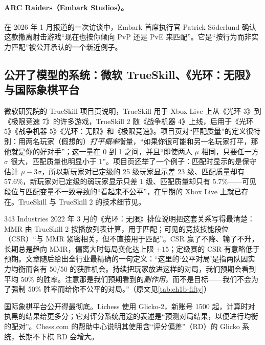 \paragraph{ARC Raiders（Embark Studios）。}
在 2026 年 1 月报道的一次访谈中，Embark 首席执行官 Patrick Söderlund 确认这款撤离射击游戏“现在也按你倾向 PvP 还是 PvE 来匹配”\cite{techradar2026arc}\tagOff{}。它是“按行为而非实力匹配”被公开承认的一个新近例子。

\subsection{公开了模型的系统：微软 TrueSkill、《光环：无限》与国际象棋平台}
\label{sec:ch1b-trueskill}

微软研究院的 TrueSkill 项目页说明，TrueSkill 用于 Xbox Live 上从《光环 3》到《极限竞速 7》的许多游戏，TrueSkill 2 随《战争机器 4》上线，后用于《光环 5》《战争机器 5》《光环：无限》和《极限竞速》\cite{microsoft2005trueskill}\tagOff。项目页对“匹配质量”的定义很特别：用两名玩家（假想的）\emph{打平概率}衡量，“如果你很可能和另一名玩家打平，那他就是你的好对手”；这一量在 0 到 1 之间，并且“即使两人 $\mu$ 相同，只要任一方 $\sigma$ 很大，匹配质量也明显小于 1”\tagOff。项目页还举了一个例子：匹配时显示的是保守估计 $\mu-3\sigma$，所以新玩家对已定级的 25 级玩家显示差 23 级、匹配质量却有 57.6\%，新玩家对已定级的弱玩家显示只差 1 级、匹配质量却只有 5.7\%\tagOff——可见段位与匹配变量不一致导致的“看起来不公平”，在早期的 Xbox Live 上就已存在。TrueSkill 与 TrueSkill 2 的技术细节见\cite{herbrich2006trueskill,minka2018trueskill}。

343 Industries 2022 年 3 月的《光环：无限》排位说明把这套关系写得最清楚\cite{343industries2022ranked}：MMR 由 TrueSkill 2 按播放列表计算，用于匹配；可见的竞技技能段位（CSR）“与 MMR 紧密相关，但不直接用于匹配”\tagOff。CSR 赢了不降、输了不升，长期总是趋向 MMR，偏离大时每局变化达上限 $\pm15$；定级赛的 CSR 有意略低于预期\tagOff。文章随后给出全行业最精确的一句定义：“这里的‘公平对局’是指两队因实力均衡而各有 50/50 的获胜机会。持续把玩家放进这样的对局，我们预期会看到平均 50\% 的胜率。注意那是我们预期看到的\emph{副作用}，而不是目标——我们不会为了强制 50\% 胜率而给你不公平的对局。”\tagOff（原文见\cref{tab:ch1b-fifty}）

国际象棋平台公开得最彻底。Lichess 使用 Glicko-2，新账号 1500 起，计算时对执黑的结果给更多分；它对评分系统用途的表述是“预测对局结果，以便进行均衡的配对”\cite{lichess2026rating}\tagOff。Chess.com 的帮助中心说明其使用含“评分偏差”（RD）的 Glicko 系统，长期不下棋 RD 会增大\cite{chesscom2026rating}\tagOff。

